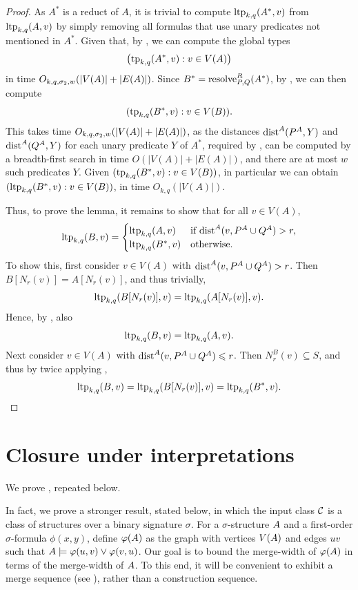 \begin{proof}
    As \(A^*\) is a reduct of \(A\), it is trivial to compute \(\textnormal{ltp}_{k,q}(A^*,
    v)\) from \(\textnormal{ltp}_{k,q}(A,v)\) by simply removing all formulas that use unary
    predicates not mentioned in \(A^*\).
    Given that, by , we can compute 
    the global types \[\bigl(\textnormal{tp}_{k,q}(A^*,v):v\in V({{A}})\bigr)\]
    in time
    $O_{k,q,\sigma_2,w}(|V({{A}})|+|E(A)|)$.
    Since \(B^*=\mathrm{resolve}^{R}_{P,Q}({{A}}^*)\), by , we can then compute \[(\textnormal{tp}_{k,q}(B^*,v) : v \in V(B)).\] This
    takes time $O_{k,q,\sigma_2,w}(|V({{A}})|+|E(A)|)$,
    as the distances
 $\mathrm{dist}^A(P^A,Y)$ and
    $\mathrm{dist}^A(Q^A,Y)$ for each
    unary predicate $Y$ of $A^*$,
    required by ,
     can be computed by a breadth-first search in time \(O(|V(A)|+|E(A)|)\),
     and there are at most $w$ such predicates $Y$.
     Given \((\textnormal{tp}_{k,q}(B^*,v) : v \in V(B))\),  in particular we can obtain \((\textnormal{ltp}_{k,q}(B^*,v) : v \in V(B))\),
     in time $O_{k,q}(|V(A)|)$.

    Thus, to prove the lemma, it remains to show that for all \(v \in V(A)\),
    \[
        \textnormal{ltp}_{k,q}({{B}},v)=\begin{cases}
            \textnormal{ltp}_{k,q}(A,v)&\text{if }\mathrm{dist}^{A}(v,P^A \cup Q^A) > r,\\
            \textnormal{ltp}_{k,q}(B^*,v)&\text{otherwise}.
        \end{cases}
    \]
    To show this, first consider \(v \in V(A)\) with \(\mathrm{dist}^A(v,P^A \cup Q^A) > r\).
    Then \(B[N_r(v)]=A[N_r(v)]\), and thus trivially, \[\textnormal{ltp}_{k,q}(B[N_r(v)],v)=\textnormal{ltp}_{k,q}(A[N_r(v)],v).\]
    Hence, by , also \[\textnormal{ltp}_{k,q}(B,v) = \textnormal{ltp}_{k,q}(A,v).\]
    Next consider \(v \in V(A)\) with \(\mathrm{dist}^A(v,P^A \cup Q^A) \leqslant r\).
    Then \(N_r^B(v) \subseteq S\), and thus by twice applying ,
    \[\textnormal{ltp}_{k,q}(B,v) = \textnormal{ltp}_{k,q}(B[N_{r}(v)],v) = \textnormal{ltp}_{k,q}(B^*,v).\qedhere\]
\end{proof}

\section{Closure under interpretations}\label{sec:closure}
We prove , repeated below.
\introinterp*


In fact, we prove a stronger result, stated below, in which the input class $\mathcal C$ is a class of structures over a binary signature $\sigma$.
For a \(\sigma\)-structure \({{A}}\) and a first-order \(\sigma\)-formula
\(\phi(x,y)\), define \(\varphi({{A}})\) as the graph with vertices
\(V({{A}})\) and edges \(uv\) such that
\({{A}}\models \varphi(u,v)\lor\varphi(v,u)\). Our goal is to bound the merge-width of $\varphi({{A}})$ in terms of the merge-width of ${{A}}$. To this end, it will be convenient to exhibit a merge sequence (see ), rather than a construction sequence.

